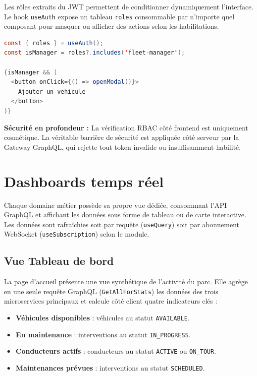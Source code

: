 \documentclass[12pt,a4paper]{article}
\begin{document}
Les r\^{o}les extraits du JWT permettent de conditionner dynamiquement l'interface. Le hook \texttt{useAuth} expose un tableau \texttt{roles} consommable par n'importe quel composant pour masquer ou afficher des actions selon les habilitations.

\begin{lstlisting}[language=Java, caption=Affichage conditionnel selon le r\^{o}le]
const { roles } = useAuth();
const isManager = roles?.includes('fleet-manager');

{isManager && (
  <button onClick={() => openModal()}>
    Ajouter un vehicule
  </button>
)}
\end{lstlisting}

\begin{infobox}
\textbf{S\'{e}curit\'{e} en profondeur :} La v\'{e}rification RBAC c\^{o}t\'{e} frontend est uniquement cosmétique. La v\'{e}ritable barrière de s\'{e}curit\'{e} est appliqu\'{e}e c\^{o}t\'{e} serveur par la Gateway GraphQL, qui rejette tout token invalide ou insuffisamment habilit\'{e}.
\end{infobox}

\section{Dashboards temps r\'{e}el}

Chaque domaine m\'{e}tier poss\`{e}de sa propre vue d\'{e}di\'{e}e, consommant l'API GraphQL et affichant les donn\'{e}es sous forme de tableau ou de carte interactive. Les donn\'{e}es sont rafra\^{i}chies soit par requ\^{e}te (\texttt{useQuery}) soit par abonnement WebSocket (\texttt{useSubscription}) selon le module.

\subsection{Vue Tableau de bord}

La page d'accueil pr\'{e}sente une vue synth\'{e}tique de l'activit\'{e} du parc. Elle agr\`{e}ge en une seule requ\^{e}te GraphQL (\texttt{GetAllForStats}) les donn\'{e}es des trois microservices principaux et calcule c\^{o}t\'{e} client quatre indicateurs cl\'{e}s :

\begin{itemize}[leftmargin=*]
  \item \textbf{V\'{e}hicules disponibles} : v\'{e}hicules au statut \texttt{AVAILABLE}.
  \item \textbf{En maintenance} : interventions au statut \texttt{IN\_PROGRESS}.
  \item \textbf{Conducteurs actifs} : conducteurs au statut \texttt{ACTIVE} ou \texttt{ON\_TOUR}.
  \item \textbf{Maintenances pr\'{e}vues} : interventions au statut \texttt{SCHEDULED}.
\end{itemize}
\end{document}
